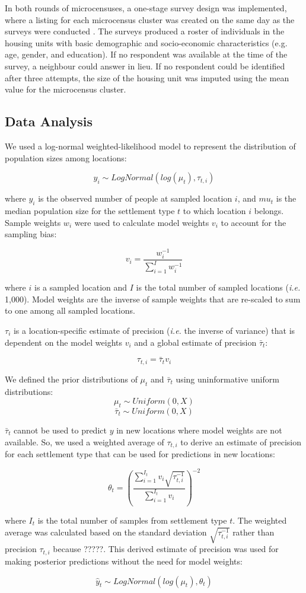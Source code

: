 \documentclass[9pt,twocolumn,twoside,lineno]{pnas-new}
\begin{document}
{	In both rounds of microcensuses, a one-stage survey design was implemented, where a listing for each microcensus cluster was created on the same day as the surveys were conducted \cite{}. The surveys produced a roster of individuals in the housing units with basic demographic and socio-economic characteristics (e.g. age, gender, and education). If no respondent was available at the time of the survey, a neighbour could answer in lieu. If no respondent could be identified after three attempts, the size of the housing unit was imputed using the mean value for the microcensus cluster. 
	
	\subsection{Data Analysis}
	
	We used a log-normal weighted-likelihood model to represent the distribution of population sizes among locations:
	
	\[ y_i \sim LogNormal( log( \mu_t ), \tau_{t,i} ) \]
	
	\noindent where $y_i$ is the observed number of people at sampled location $i$, and $mu_t$ is the median population size for the settlement type $t$ to which location $i$ belongs. Sample weights $w_i$ were used to calculate model weights $v_i$ to account for the sampling bias:
	
	\[ v_i = \frac{ w_i^{-1} } { \sum_{i=1}^{I} w_i^{-1} }  \]
	
	\noindent where $i$ is a sampled location and $I$ is the total number of sampled locations (\textit{i.e.} 1,000).  Model weights are the inverse of sample weights that are re-scaled to sum to one among all sampled locations.
	
	$\tau_i$ is a location-specific estimate of precision (\textit{i.e.} the inverse of variance) that is dependent on the model weights $v_i$ and a global estimate of precision $\bar{\tau}_t$:
	
	\[ \tau_{t,i} = \bar{\tau}_t v_i \]
	
	
	
	
	We defined the prior distributions of $\mu_t$ and $\bar{\tau}_t$ using uninformative uniform distributions:
	 \[ \mu_t \sim Uniform(0, X) \]
	 \[ \bar{\tau}_t \sim Uniform(0, X) \]
	
	$\bar{\tau}_t$ cannot be used to predict $y$ in new locations where model weights are not available.  So, we used a weighted average of $\tau_{t,i}$ to derive an estimate of precision for each settlement type that can be used for predictions in new locations:
	
	\[ \theta_t = (\frac{\sum_{i=1}^{I_t} v_i \sqrt{\tau_{t,i}^{-1}} }{\sum_{i=1}^{I_t} v_i})^{-2}   \]
	
	\noindent where $I_t$ is the total number of samples from settlement type $t$. The weighted average was calculated based on the standard deviation $\sqrt{\tau_{t,i}^{-1}}$ rather than precision $\tau_{t,i}$ because ?????. This derived estimate of precision was used for making posterior predictions without the need for model weights:
	
	\[ \hat{y}_t \sim LogNormal( log( \mu_t ), \theta_t) \]


	
}
\end{document}

